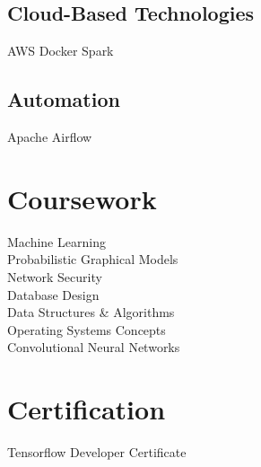 \documentclass{fortythree_resume}
\begin{document}
\begin{minipage}[t]{0.33\textwidth}
\subsection{Cloud-Based Technologies}
AWS \textbullet{} Docker \textbullet{} Spark
\subsection{Automation}
Apache Airflow
\sectionsep

\section{Coursework}
Machine Learning\\
Probabilistic Graphical Models\\
Network Security\\
Database Design\\
Data Structures \& Algorithms\\
Operating Systems Concepts\\
Convolutional Neural Networks
\sectionsep

\section{Certification}
Tensorflow Developer Certificate

\end{minipage}
\hfill
\end{document}

